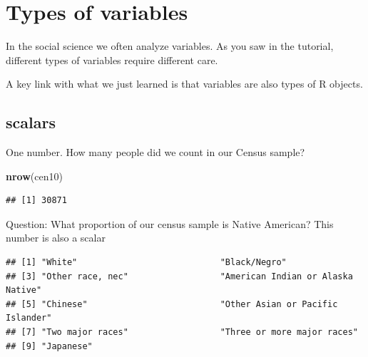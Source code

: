 \documentclass[]{book}
\newenvironment{Shaded}{\begin{snugshade}}{\end{snugshade}}
\newcommand{\CommentTok}[1]{\textcolor[rgb]{0.56,0.35,0.01}{\textit{#1}}}
\newcommand{\KeywordTok}[1]{\textcolor[rgb]{0.13,0.29,0.53}{\textbf{#1}}}
\newcommand{\NormalTok}[1]{#1}
\newcommand{\OperatorTok}[1]{\textcolor[rgb]{0.81,0.36,0.00}{\textbf{#1}}}
\newcommand{\StringTok}[1]{\textcolor[rgb]{0.31,0.60,0.02}{#1}}
\theoremstyle{definition}
\theoremstyle{definition}
\theoremstyle{definition}
\theoremstyle{remark}
\begin{document}
\hypertarget{types-of-variables}{%
\section{Types of variables}\label{types-of-variables}}

In the social science we often analyze variables. As you saw in the tutorial, different types of variables require different care.

A key link with what we just learned is that variables are also types of R objects.

\hypertarget{scalars}{%
\subsection{scalars}\label{scalars}}

One number. How many people did we count in our Census sample?

\begin{Shaded}
\begin{Highlighting}[]
\KeywordTok{nrow}\NormalTok{(cen10)}
\end{Highlighting}
\end{Shaded}

\begin{verbatim}
## [1] 30871
\end{verbatim}

Question: What proportion of our census sample is Native American? This number is also a scalar

\begin{Shaded}
\end{Shaded}

\begin{verbatim}
## [1] "White"                            "Black/Negro"                     
## [3] "Other race, nec"                  "American Indian or Alaska Native"
## [5] "Chinese"                          "Other Asian or Pacific Islander" 
## [7] "Two major races"                  "Three or more major races"       
## [9] "Japanese"
\end{verbatim}

\begin{Shaded}
\end{Shaded}
\end{document}
